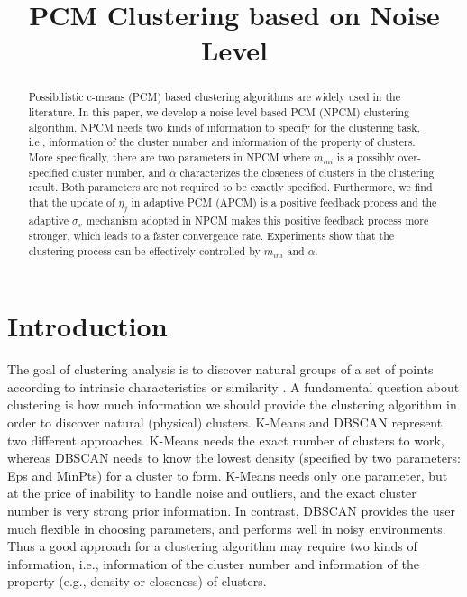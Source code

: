 \documentclass[conference]{IEEEtran}
\date{}
\title{PCM Clustering based on Noise Level}
\theoremstyle{definition}
\begin{document}
\maketitle
\begin{abstract}
Possibilistic c-means (PCM) based clustering algorithms are widely used in the literature. In this paper, we develop a noise level based PCM (NPCM) clustering algorithm. NPCM needs two kinds of information to specify for the clustering task, i.e., information of the cluster number and information of the property of clusters. More specifically, there are two parameters in NPCM where $m_{ini}$ is a possibly over-specified cluster number, and $\alpha$ characterizes the closeness of clusters in the clustering result. Both parameters are not required to be exactly specified. Furthermore, we find that the update of $\eta_j$ in adaptive PCM (APCM) is a positive feedback process and the adaptive $\sigma_v$ mechanism adopted in NPCM makes this positive feedback process more stronger, which leads to a faster convergence rate.
Experiments show that the clustering process can be effectively controlled by $m_{ini}$ and $\alpha$.
\end{abstract}
\section{Introduction}
\label{sec-1}
The goal of clustering analysis is to discover natural groups of a set of points according to intrinsic characteristics or similarity \cite{jain_data_2010}. A fundamental question about clustering is how much information we should provide the clustering algorithm in order to discover natural (physical) clusters. K-Means \cite{jain_data_2010} and DBSCAN \cite{ester_density-based_1996} represent two different approaches. K-Means needs the exact number of clusters to work, whereas DBSCAN needs to know the lowest density (specified by two parameters: Eps and MinPts) for a cluster to form. K-Means needs only one parameter, but at the price of inability to handle noise and outliers, and the exact cluster number is very strong prior information. In contrast, DBSCAN provides the user much flexible in choosing parameters, and performs well in noisy environments.
Thus a good approach for a clustering algorithm may require two kinds of information, i.e., information of the cluster number and information of the property (e.g., density or closeness) of clusters.
\end{document}
